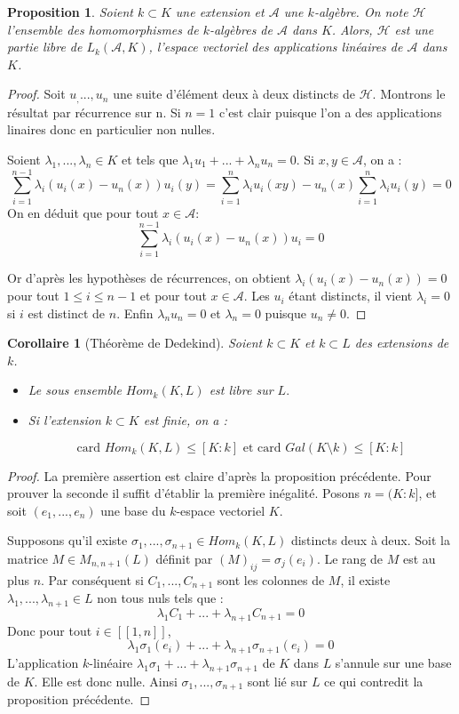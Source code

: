 \documentclass[12pt,a4paper]{report}
\newtheorem{prop}[thm]{\bf Proposition}
\newtheorem{cor}[thm]{\bf Corollaire}
\begin{document}
\begin{prop}\rm
Soient $k \subset K$ une extension et $\mathcal{A}$ une $k$-algèbre. On note $\mathcal{H}$ l'ensemble des homomorphismes de $k$-algèbres de $\mathcal{A}$ dans $K$. Alors, $\mathcal{H}$ est une partie libre de $L_k(\mathcal{A},K)$, l'espace vectoriel des applications linéaires de $\mathcal{A}$ dans $K$. 
\end{prop}

\begin{proof}
Soit $ u_,...,u_n$ une suite d'élément deux à deux distincts de $\mathcal{H}$. Montrons le résultat par récurrence sur n. Si $n=1$ c'est clair puisque l'on a des applications linaires donc en particulier non nulles. 

Soient $\lambda_1,..., \lambda_n \in K$ et tels que $\lambda_1u_1+...+\lambda_nu_n=0$. Si $x,y\in \mathcal{A}$, on a : 
$$\sum_{i=1}^{n-1}\lambda_i(u_i(x)-u_n(x))u_i(y)=\sum_{i=1}^{n}\lambda_iu_i(xy)-u_n(x)\sum_{i=1}^{n}\lambda_iu_i(y)=0$$
On en déduit que pour tout $x \in \mathcal{A}$:
$$\sum_{i=1}^{n-1}\lambda_i(u_i(x)-u_n(x))u_i=0$$

Or d'après les hypothèses de récurrences, on obtient $\lambda_i(u_i(x)-u_n(x))=0$ pour tout $1 \leq i\leq n-1$ et pour tout $x\in \mathcal{A}$. Les $u_i$ étant distincts, il vient $\lambda_i=0$ si $i$ est distinct de $n$. Enfin $\lambda_n u_n=0$ et $\lambda_n=0$ puisque $u_n\neq 0$. 
\end{proof}

\begin{cor}[Théorème de Dedekind]\rm
Soient $k\subset K$ et $k\subset L$ des extensions de $k$. 
\begin{itemize}
\item Le sous ensemble $Hom_k(K,L)$ est libre sur $L.$

\item Si l'extension $k\subset K $ est finie, on a : 

$$\text{card }Hom_k(K,L)\leq [K:k] \text{  et  card }Gal(K\setminus k)\leq [K:k]$$
\end{itemize}

\end{cor}

\begin{proof}
La première assertion est claire d'après la proposition précédente. Pour prouver la seconde il suffit d'établir la première inégalité. Posons $n=(K:k]$, et soit $(e_1,...,e_n)$ une base du $k$-espace vectoriel $K$. 

Supposons qu'il existe $\sigma_1,...,\sigma_{n+1}\in Hom_k(K,L)$ distincts deux à deux. Soit la matrice $M\in M_{n,n+1}(L)$ définit par $(M)_{ij}=\sigma_j(e_i)$. Le rang de $M$ est au plus $n$. Par conséquent si $C_1,...,C_{n+1}$ sont les colonnes de $M$, il existe $\lambda_1,...,\lambda_{n+1}\in L$ non tous nuls tels que : 
$$\lambda_1C_1+...+\lambda_{n+1}C_{n+1}=0$$
Donc pour tout $i\in [\![1,n]\!]$, 
$$\lambda_1\sigma_1(e_i)+...+\lambda_{n+1}\sigma_{n+1}(e_i)=0$$
L'application $k$-linéaire $\lambda_1\sigma_1+...+\lambda_{n+1}\sigma_{n+1}$ de $K$ dans $L$ s'annule sur une base de $K$. Elle est donc nulle. Ainsi  $\sigma_1,...,\sigma_{n+1}$ sont lié sur $L$ ce qui contredit la proposition précédente. 
\end{proof}
\end{document}
